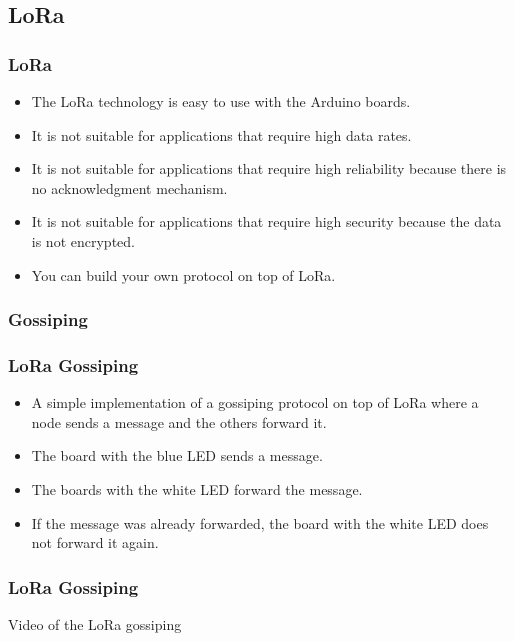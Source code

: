 \documentclass{beamer}
\begin{document}
\subsection{LoRa}
\begin{frame}
    \frametitle{LoRa}
    \begin{itemize}[<+->]
        \item The LoRa technology is easy to use with the Arduino boards.
        \item It is not suitable for applications that require high data rates.
        \item It is not suitable for applications that require high reliability because there
              is no acknowledgment mechanism.
        \item It is not suitable for applications that require high security because the data
              is not encrypted.
        \item You can build your own protocol on top of LoRa.
    \end{itemize}
\end{frame}

\subsubsection{Gossiping}
\begin{frame}
    \frametitle{LoRa Gossiping}

    \begin{itemize}[<+->]
        \item A simple implementation of a gossiping protocol on top of LoRa where a node
              sends a message and the others forward it.
        \item The board with the blue LED sends a message.
        \item The boards with the white LED forward the message.
        \item If the message was already forwarded, the board with the white LED does not
              forward it again.
    \end{itemize}
\end{frame}

\begin{frame}
    \frametitle{LoRa Gossiping}
    \begin{center}
        Video of the LoRa gossiping
    \end{center}
\end{frame}
\end{document}
